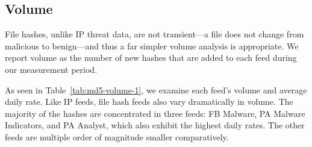 \subsection{Volume}

File hashes, unlike IP threat data, are not transient---a file does
not change from malicious to benign---and thus a far simpler volume
analysis is appropriate. We report volume as the number of new hashes
that are added to each feed during our measurement period.

As seen in Table~\ref{tab:md5-volume-1}, we examine each feed's volume and
average daily rate. Like IP feeds, file hash feeds also vary dramatically in
volume. The majority of the hashes are concentrated in three feeds: FB Malware,
PA Malware Indicators, and PA Analyst, which also exhibit the highest daily rates.
The other feeds are multiple order of magnitude smaller comparatively.

